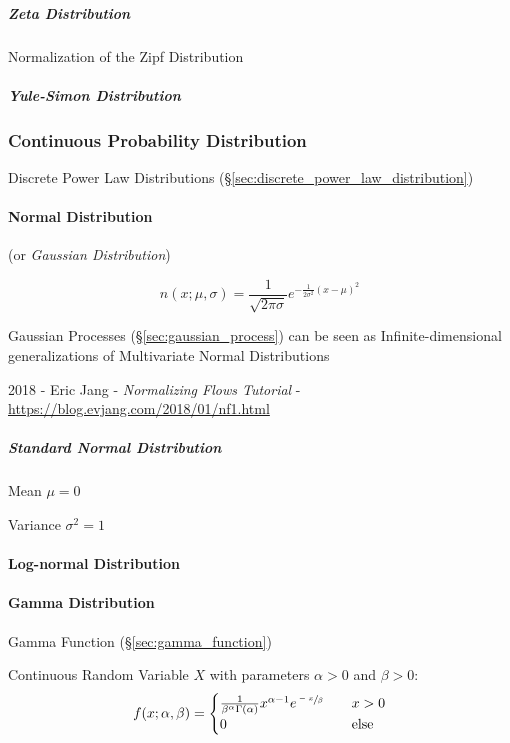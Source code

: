 \subparagraph{Zeta Distribution}\label{sec:zeta_distribution}\hfill

Normalization of the Zipf Distribution

\subparagraph{Yule-Simon Distribution}
\label{sec:yule_simon_distribution}\hfill



\subsubsection{Continuous Probability Distribution}
\label{sec:continuous_probability}

\fist Discrete Power Law Distributions
(\S\ref{sec:discrete_power_law_distribution})



\paragraph{Normal Distribution}\label{sec:normal_distribution}\hfill

(or \emph{Gaussian Distribution})

\[
  n (x; \mu, \sigma) =
  \frac{1}{\sqrt{2\pi \sigma}} e^{-\frac{1}{2 \sigma^2}(x - \mu)^2}
\]

\fist Gaussian Processes (\S\ref{sec:gaussian_process}) can be seen as
Infinite-dimensional generalizations of Multivariate Normal Distributions

2018 - Eric Jang
- \emph{Normalizing Flows Tutorial}
- \url{https://blog.evjang.com/2018/01/nf1.html}



\subparagraph{Standard Normal Distribution}\label{sec:standard_normal}\hfill

Mean $\mu = 0$

Variance $\sigma^2 = 1$



\paragraph{Log-normal Distribution}\label{sec:lognormal_distribution}\hfill

\paragraph{Gamma Distribution}\label{sec:gamma_distribution}\hfill

Gamma Function (\S\ref{sec:gamma_function})

Continuous Random Variable $X$ with parameters $\alpha > 0$ and $\beta
> 0$:
\[
  f(x; \alpha, \beta) =
  \begin{cases}
  \frac{1}{\beta^\alpha \Gamma(\alpha)} x^{\alpha-1} e^{\sfrac{-x}{\beta}}     & \quad x > 0 \\
  0     & \quad\text{else} \\
  \end{cases}
\]

